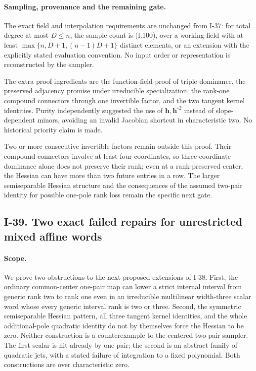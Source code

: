 \paragraph{Sampling, provenance and the remaining gate.}
The exact field and interpolation requirements are unchanged
from I-37: for total degree at most $D\le n$, the sample count
is (I.100), over a working field with at least
$\max\{n,D+1,(n-1)D+1\}$ distinct elements, or an extension
with the explicitly stated evaluation convention. No input
order or representation is reconstructed by the sampler.

The extra proof ingredients are the function-field proof of
triple dominance, the preserved adjacency promise under
irreducible specialization, the rank-one compound connectors
through one invertible factor, and the two tangent kernel
identities. Purity independently suggested the use of
$\mathbf h,\mathbf h^{\circ2}$ instead of slope-dependent
minors, avoiding an invalid Jacobian shortcut in characteristic
two. No historical priority claim is made.

Two or more consecutive invertible factors remain outside
this proof. Their compound connectors involve at least four
coordinates, so three-coordinate dominance alone does not
preserve their rank; even at a rank-preserved center, the
Hessian can have more than two future entries in a row. The
larger semiseparable Hessian structure and the consequences
of the assumed two-pair identity for possible one-pole rank
loss remain the specific next gate.

\subsection{I-39. Two exact failed repairs for unrestricted mixed affine words}
\label{I-39}

\paragraph{Scope.}
We prove two obstructions to the next proposed extensions of I-38.
First, the ordinary common-center one-pair map can lower a strict
internal interval from generic rank two to rank one even in an
irreducible multilinear width-three scalar word whose every generic
interval rank is two or three. Second, the symmetric semiseparable
Hessian pattern, all three tangent kernel identities, and the whole
additional-pole quadratic identity do not by themselves force the
Hessian to be zero. Neither construction is a counterexample to
the centered two-pair sampler. The first scalar is hit already
by one pair; the second is an abstract family of quadratic jets,
with a stated failure of integration to a fixed polynomial.
Both constructions are over characteristic zero.

